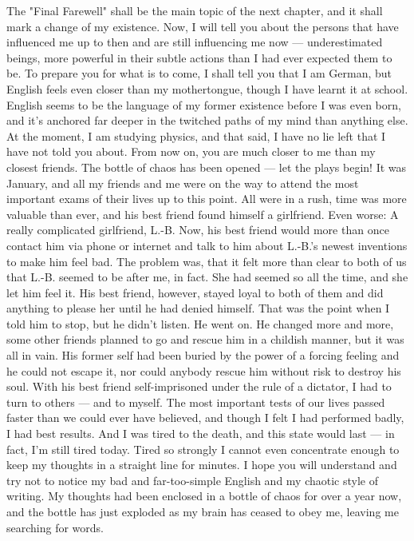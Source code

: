 The "Final Farewell" shall be the main topic of the next chapter, and it shall mark a change of my existence. Now, I will tell you about the persons that have influenced me up to then and are still influencing me now --- underestimated beings, more powerful in their subtle actions than I had ever expected them to be. 
To prepare you for what is to come, I shall tell you that I am German, but English feels even closer than my mothertongue, though I have learnt it at school. English seems to be the language of my former existence before I was even born, and it's anchored far deeper in the twitched paths of my mind than anything else. 
At the moment, I am studying physics, and that said, I have no lie left that I have not told you about. From now on, you are much closer to me than my closest friends. 
The bottle of chaos has been opened --- let the plays begin! 
It was January, and all my friends and me were on the way to attend the most important exams of their lives up to this point. All were in a rush, time was more valuable than ever, and his best friend found himself a girlfriend. Even worse: A really complicated girlfriend, L.-B. Now, his best friend would more than once contact him via phone or internet and talk to him about L.-B.'s newest inventions to make him feel bad. The problem was, that it felt more than clear to both of us that L.-B. seemed to be after me, in fact. She had seemed so all the time, and she let him feel it. His best friend, however, stayed loyal to both of them and did anything to please her until he had denied himself. That was the point when I told him to stop, but he didn't listen. He went on. He changed more and more, some other friends planned to go and rescue him in a childish manner, but it was all in vain. His former self had been buried by the power of a forcing feeling and he could not escape it, nor could anybody rescue him without risk to destroy his soul. With his best friend self-imprisoned under the rule of a dictator, I had to turn to others --- and to myself. 
The most important tests of our lives passed faster than we could ever have believed, and though I felt I had performed badly, I had best results. And I was tired to the death, and this state would last --- in fact, I'm still tired today. Tired so strongly I cannot even concentrate enough to keep my thoughts in a straight line for minutes. I hope you will understand and try not to notice my bad and far-too-simple English and my chaotic style of writing. My thoughts had been enclosed in a bottle of chaos for over a year now, and the bottle has just exploded as my brain has ceased to obey me, leaving me searching for words. 
